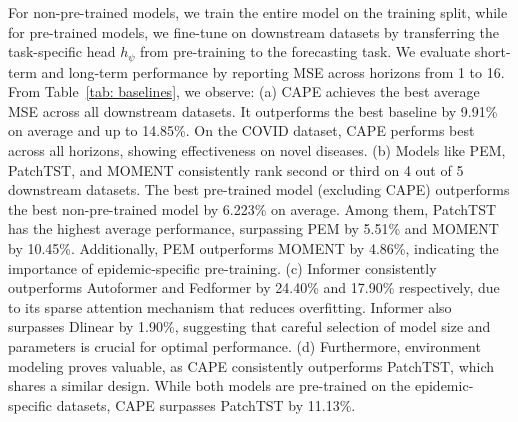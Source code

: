 For non-pre-trained models, we train the entire model on the training split, while for pre-trained models, we fine-tune on downstream datasets by transferring the task-specific head \( h_\psi \) from pre-training to the forecasting task. We evaluate short-term and long-term performance by reporting MSE across horizons from 1 to 16. From Table~\ref{tab: baselines}, we observe:
(a) CAPE achieves the best average MSE across all downstream datasets. It outperforms the best baseline by 9.91\% on average and up to 14.85\%. On the COVID dataset, CAPE performs best across all horizons, showing effectiveness on novel diseases.
(b) Models like PEM, PatchTST, and MOMENT consistently rank second or third on 4 out of 5 downstream datasets. The best pre-trained model (excluding CAPE) outperforms the best non-pre-trained model by 6.223\% on average. Among them, PatchTST has the highest average performance, surpassing PEM by 5.51\% and MOMENT by 10.45\%. Additionally, PEM outperforms MOMENT by 4.86\%, indicating the importance of epidemic-specific pre-training.
(c) Informer consistently outperforms Autoformer and Fedformer by 24.40\% and 17.90\% respectively, due to its sparse attention mechanism that reduces overfitting. Informer also surpasses Dlinear by 1.90\%, suggesting that careful selection of model size and parameters is crucial for optimal performance.
(d) Furthermore, environment modeling proves valuable, as CAPE consistently outperforms PatchTST, which shares a similar design. While both models are pre-trained on the epidemic-specific datasets, CAPE surpasses PatchTST by 11.13\%.



